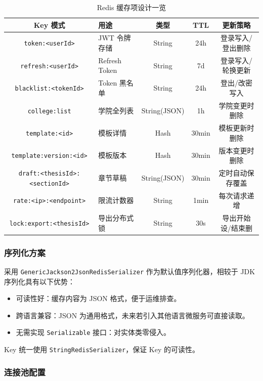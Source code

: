 \documentclass{../softeng}
\begin{document}
\begin{table}[htbp]
\centering
\caption{Redis 缓存项设计一览}
\label{tab:redis-design}
\begin{tabular}{|c|p{3cm}|c|c|c|}
\hline
\textbf{Key 模式} & \textbf{用途} & \textbf{类型} & \textbf{TTL} & \textbf{更新策略} \\
\hline
\texttt{token:<userId>} & JWT 令牌存储 & String & 24h & 登录写入/登出删除 \\
\hline
\texttt{refresh:<userId>} & Refresh Token & String & 7d & 登录写入/轮换更新 \\
\hline
\texttt{blacklist:<tokenId>} & Token 黑名单 & String & 24h & 登出/改密写入 \\
\hline
\texttt{college:list} & 学院全列表 & String(JSON) & 1h & 学院变更时删除 \\
\hline
\texttt{template:<id>} & 模板详情 & Hash & 30min & 模板更新时删除 \\
\hline
\texttt{template:version:<id>} & 模板版本 & Hash & 30min & 版本变更时删除 \\
\hline
\texttt{draft:<thesisId>:<sectionId>} & 章节草稿 & String(JSON) & 30min & 定时自动保存覆盖 \\
\hline
\texttt{rate:<ip>:<endpoint>} & 限流计数器 & String & 1min & 每次请求递增 \\
\hline
\texttt{lock:export:<thesisId>} & 导出分布式锁 & String & 30s & 导出开始设/结束删 \\
\hline
\end{tabular}
\end{table}

\subsubsection{序列化方案}

采用 \texttt{GenericJackson2JsonRedisSerializer} 作为默认值序列化器，相较于 JDK 序列化具有以下优势：
\begin{itemize}
    \item 可读性好：缓存内容为 JSON 格式，便于运维排查。
    \item 跨语言兼容：JSON 为通用格式，未来若引入其他语言微服务可直接读取。
    \item 无需实现 \texttt{Serializable} 接口：对实体类零侵入。
\end{itemize}

Key 统一使用 \texttt{StringRedisSerializer}，保证 Key 的可读性。

\subsubsection{连接池配置}
\end{document}
